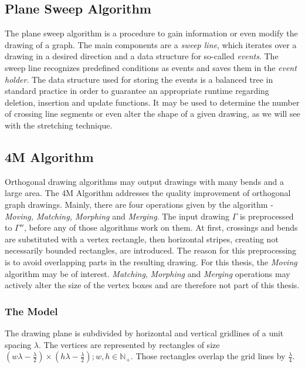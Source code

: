 \subsection{Plane Sweep Algorithm}
The plane sweep algorithm is a procedure to gain information or even modify the drawing of a graph. The main components are a \textit{sweep line}, which iterates over a drawing in a desired direction and a data structure for so-called \textit{events}. The sweep line recognizes predefined conditions as events and saves them in the \textit{event holder}. The data structure used for storing the events is a balanced tree in standard practice in order to guarantee an appropriate runtime regarding deletion, insertion and update functions. It may be used to determine the number of crossing line segments or even alter the shape of a given drawing, as we will see with the stretching technique.
\subsection{4M Algorithm {\cite{4M}}}\label{section:4M}
Orthogonal drawing algorithms may output drawings with many bends and a large area. The 4M Algorithm addresses the quality improvement of orthogonal graph drawings. Mainly, there are four operations given by the algorithm - \textit{Moving, Matching, Morphing} and \textit{Merging}. The input drawing $\Gamma$ is preprocessed to $\Gamma ''$, before any of those algorithms work on them. At first, crossings and bends are substituted with a vertex rectangle, then horizontal stripes, creating not necessarily bounded rectangles, are introduced. The reason for this preprocessing is to avoid overlapping parts in the resulting drawing. For this thesis, the \textit{Moving} algorithm may be of interest. \textit{Matching}, \textit{Morphing} and \textit{Merging} operations may actively alter the size of the vertex boxes and are therefore not part of this thesis.
\subsubsection*{The Model}
The drawing plane is subdivided by horizontal and vertical gridlines of a unit spacing $\lambda$. The vertices are represented by rectangles of size $\left(w\lambda - \frac{\lambda}{2}\right)\times\left(h\lambda - \frac{\lambda}{2}\right);w,h\in\mathbb{N}_+$. Those rectangles overlap the grid lines by $\frac{\lambda}{4}$. 

